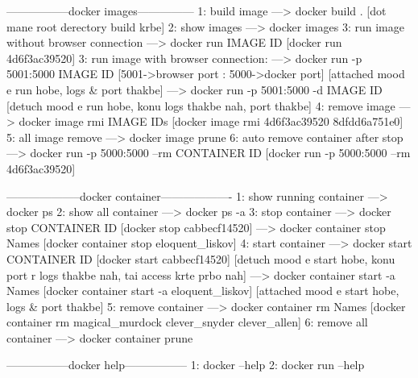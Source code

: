 -----------------docker images---------------
1: build image ---> docker build . [dot mane root derectory build krbe]
2: show images ---> docker images
3: run image without browser connection ---> docker run IMAGE ID [docker run 4d6f3ac39520]
3: run image with browser connection:
---> docker run -p 5001:5000 IMAGE ID [5001->browser port : 5000->docker port] [attached mood e run hobe, logs & port thakbe]
---> docker run -p 5001:5000 -d IMAGE ID [detuch mood e run hobe, konu logs thakbe nah, port thakbe]
4: remove image ---> docker image rmi IMAGE IDs [docker image rmi 4d6f3ac39520 8dfdd6a751e0]
5: all image remove ---> docker image prune
6: auto remove container after stop 
---> docker run -p 5000:5000 --rm CONTAINER ID [docker run -p 5000:5000 --rm 4d6f3ac39520]


--------------------docker container-------------------
1: show running container ---> docker ps
2: show all container ---> docker ps -a
3: stop container 
---> docker stop CONTAINER ID [docker stop cabbecf14520]
---> docker container stop Names [docker container stop eloquent_liskov]
4: start container 
---> docker start CONTAINER ID [docker start cabbecf14520] [detuch mood e start hobe, konu port r logs thakbe nah, tai access krte prbo nah]
---> docker container start -a Names [docker container start -a eloquent_liskov] [attached mood e start hobe, logs & port thakbe]
5: remove container 
---> docker container rm Names [docker container rm magical_murdock clever_snyder clever_allen]
6: remove all container
---> docker container prune

-----------------docker help-----------------
1: docker --help
2: docker run --help